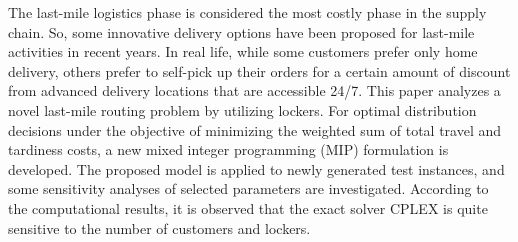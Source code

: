 
\begin{Abstrakt}
    The last-mile logistics phase is considered the most costly phase in the supply chain. So, some innovative delivery options have been proposed for last-mile activities in recent years. In real life, while some customers prefer only home delivery, others prefer to self-pick up their orders for a certain amount of discount from advanced delivery locations that are accessible 24/7. This paper analyzes a novel last-mile routing problem by utilizing lockers. For optimal distribution decisions under the objective of minimizing the weighted sum of total travel and tardiness costs, a new mixed integer programming (MIP) formulation is developed. The proposed model is applied to newly generated test instances, and some sensitivity analyses of selected parameters are investigated. According to the computational results, it is observed that the exact solver CPLEX is quite sensitive to the number of customers and lockers.
\end{Abstrakt}



\clearpage